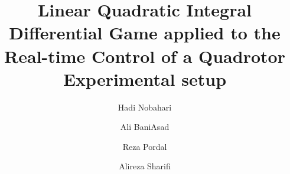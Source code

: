 \documentclass[3p,times]{elsarticle}
\begin{document}

\begin{frontmatter}



\dochead{}

\title{Linear Quadratic Integral Differential Game applied to the Real-time Control of a Quadrotor Experimental setup}


\author{Hadi Nobahari}
\address{Department of Aerospace Engineering
Sharif University of Technology Tehran, Iran}
\author{Ali BaniAsad}
\address{Department of Aerospace Engineering
Sharif University of Technology Tehran, Iran}
\author{Reza Pordal}
\address{Department of Aerospace Engineering
Sharif University of Technology Tehran, Iran}
\author{Alireza Sharifi}
\address{Department of Aerospace Engineering
Sharif University of Technology Tehran, Iran}

\address{}


\end{frontmatter}
\end{document}
